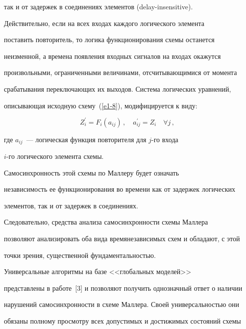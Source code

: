 так и от задержек в соединениях элементов (delay-insensitive). 


      


      Действительно, если на всех входах каждого логического элемента 


поставить повторитель, то логика функционирования схемы останется 


неизменной, а времена появления входных сигналов на входах окажутся 


произвольными, ограниченными величинами, отсчитывающимися от момента 


срабатывания переключающих их выходов. Система логических уравнений, 


описывающая исходную схему~(\ref{e1-8}), модифицируется к виду: 


      $$


      Z_i^\prime = F_i(a_{ij})\,, \quad a^\prime_{ij} = Z_i\quad \forall j\,,


      $$


      где $a_{ij}$~--- логическая функция повторителя для $j$-го входа 


      $i$-го логического элемента схемы.


      


      Самосинхронность этой схемы по Маллеру будет означать 


независимость ее функционирования во времени как от задержек логических 


элементов, так и от задержек в соединениях.


      


      Следовательно, средства анализа самосинхронности схемы Маллера 


позволяют анализировать оба вида времянезависимых схем и обладают, с этой 


точки зрения, существенной фундаментальностью.


      


      Универсальные алгоритмы на базе <<глобальных моделей>> 


представлены в работе~[3] и позволяют получить однозначный ответ о наличии 


нарушений самосинхронности в схеме Маллера. Своей универсальностью они 


обязаны полному просмотру всех допустимых и достижимых состояний схемы 


